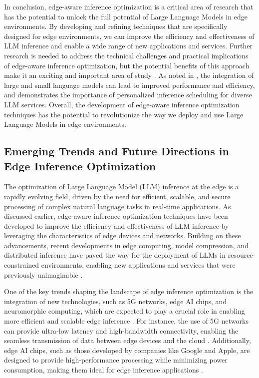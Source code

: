 \documentclass[11pt,a4paper]{article}
\begin{document}
In conclusion, edge-aware inference optimization is a critical area of research that has the potential to unlock the full potential of Large Language Models in edge environments. By developing and refining techniques that are specifically designed for edge environments, we can improve the efficiency and effectiveness of LLM inference and enable a wide range of new applications and services. Further research is needed to address the technical challenges and practical implications of edge-aware inference optimization, but the potential benefits of this approach make it an exciting and important area of study \cite{doi:10.1109/access.2024.3351308}. As noted in \cite{arxiv:2406.12295}, the integration of large and small language models can lead to improved performance and efficiency, and \cite{arxiv:2405.14636} demonstrates the importance of personalized inference scheduling for diverse LLM services. Overall, the development of edge-aware inference optimization techniques has the potential to revolutionize the way we deploy and use Large Language Models in edge environments.


\subsection{Emerging Trends and Future Directions in Edge Inference Optimization}


The optimization of Large Language Model (LLM) inference at the edge is a rapidly evolving field, driven by the need for efficient, scalable, and secure processing of complex natural language tasks in real-time applications. As discussed earlier, edge-aware inference optimization techniques have been developed to improve the efficiency and effectiveness of LLM inference by leveraging the characteristics of edge devices and networks. Building on these advancements, recent developments in edge computing, model compression, and distributed inference have paved the way for the deployment of LLMs in resource-constrained environments, enabling new applications and services that were previously unimaginable \cite{doi:10.1145/3466752.3480095}. 

One of the key trends shaping the landscape of edge inference optimization is the integration of new technologies, such as 5G networks, edge AI chips, and neuromorphic computing, which are expected to play a crucial role in enabling more efficient and scalable edge inference \cite{doi:10.1109/mnet.2025.3539338}. For instance, the use of 5G networks can provide ultra-low latency and high-bandwidth connectivity, enabling the seamless transmission of data between edge devices and the cloud \cite{doi:10.1109/vtc2024-spring62846.2024.10683177}. Additionally, edge AI chips, such as those developed by companies like Google and Apple, are designed to provide high-performance processing while minimizing power consumption, making them ideal for edge inference applications \cite{arxiv:2408.00462}.
\end{document}
